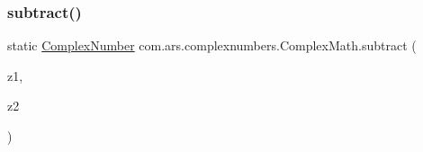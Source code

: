 \subsubsection{\texorpdfstring{subtract()}{subtract()}\hspace{0.1cm}{\footnotesize\ttfamily [1/2]}}
{\footnotesize\ttfamily static \hyperlink{classcom_1_1ars_1_1complexnumbers_1_1_complex_number}{Complex\+Number} com.\+ars.\+complexnumbers.\+Complex\+Math.\+subtract (\begin{DoxyParamCaption}\item[{\hyperlink{classcom_1_1ars_1_1complexnumbers_1_1_complex_number}{Complex\+Number}}]{z1,  }\item[{\hyperlink{classcom_1_1ars_1_1complexnumbers_1_1_complex_number}{Complex\+Number}}]{z2 }\end{DoxyParamCaption})\hspace{0.3cm}{\ttfamily [static]}}

